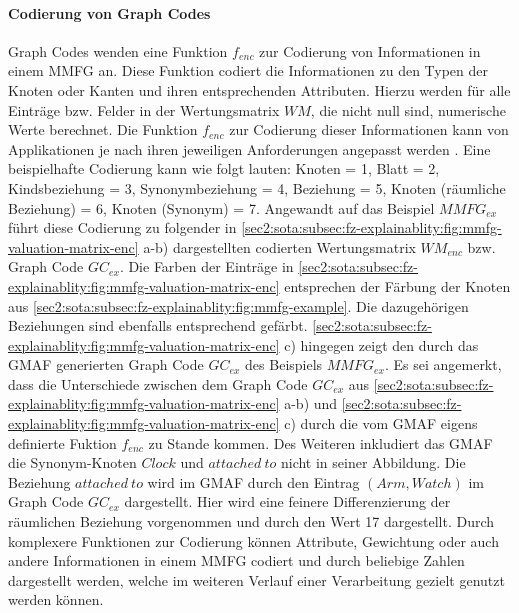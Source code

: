 \paragraph{Codierung von Graph Codes}
\label{sec2:sota:par:gc-encoding}
Graph Codes wenden eine Funktion $f_{enc}$ zur Codierung von Informationen in einem MMFG an.
Diese Funktion codiert die Informationen zu den Typen der Knoten oder Kanten und ihren entsprechenden Attributen.
Hierzu werden für alle Einträge bzw. Felder in der Wertungsmatrix $WM$, die nicht null sind, numerische Werte berechnet.
Die Funktion $f_{enc}$ zur Codierung dieser Informationen kann von Applikationen je nach ihren jeweiligen Anforderungen angepasst werden \cite{gc-2d-proj-mmfg}.
Eine beispielhafte Codierung kann wie folgt lauten: Knoten = 1, Blatt = 2, Kindsbeziehung = 3, Synonymbeziehung = 4, Beziehung = 5, Knoten (räumliche Beziehung) = 6, Knoten (Synonym) = 7.
Angewandt auf das Beispiel $MMFG_{ex}$ führt diese Codierung zu folgender in \cref{sec2:sota:subsec:fz-explainablity:fig:mmfg-valuation-matrix-enc} a-b) dargestellten codierten Wertungsmatrix $WM_{enc}$ bzw. Graph Code $GC_{ex}$.
Die Farben der Einträge in \cref{sec2:sota:subsec:fz-explainablity:fig:mmfg-valuation-matrix-enc} entsprechen der Färbung der Knoten aus \cref{sec2:sota:subsec:fz-explainablity:fig:mmfg-example}.
Die dazugehörigen Beziehungen sind ebenfalls entsprechend gefärbt.
\cref{sec2:sota:subsec:fz-explainablity:fig:mmfg-valuation-matrix-enc} c) hingegen zeigt den durch das GMAF generierten Graph Code $GC_{ex}$ des Beispiels $MMFG_{ex}$.
Es sei angemerkt, dass die Unterschiede zwischen dem Graph Code $GC_{ex}$ aus \cref{sec2:sota:subsec:fz-explainablity:fig:mmfg-valuation-matrix-enc} a-b) und \cref{sec2:sota:subsec:fz-explainablity:fig:mmfg-valuation-matrix-enc} c) durch die vom GMAF eigens definierte Fuktion $f_{enc}$ zu Stande kommen.
Des Weiteren inkludiert das GMAF die Synonym-Knoten $Clock$ und $attached~to$ nicht in seiner Abbildung.
Die Beziehung $attached~to$ wird im GMAF durch den Eintrag $(Arm,Watch)$ im Graph Code $GC_{ex}$ dargestellt.
Hier wird eine feinere Differenzierung der räumlichen Beziehung vorgenommen und durch den Wert 17 dargestellt.
Durch komplexere Funktionen zur Codierung können Attribute, Gewichtung oder auch andere Informationen in einem MMFG codiert und durch beliebige Zahlen dargestellt werden, welche im weiteren Verlauf einer Verarbeitung gezielt genutzt werden können.

